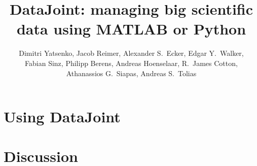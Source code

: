 \documentclass[10pt,twocolumn]{article}
\title{DataJoint: managing big scientific data using MATLAB or Python}
\author{Dimitri Yatsenko, Jacob Reimer, Alexander S.~Ecker, Edgar Y.~Walker,\\ 
Fabian Sinz, Philipp Berens, Andreas Hoenselaar, R.~James Cotton,\\ Athanassios G.~Siapas, Andreas S.~Tolias
}
\begin{document}
\maketitle

\begin{abstract}
  
\end{abstract}


\section*{Using DataJoint}






\section*{Discussion}





\end{document}
